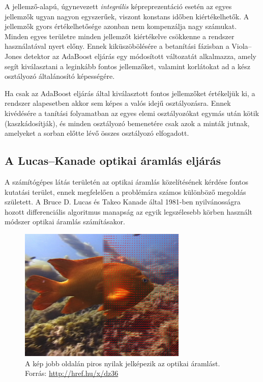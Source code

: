A jellemző-alapú, úgynevezett \emph{integrális} képreprezentáció esetén az egyes jellemzők ugyan nagyon egyszerűek, viszont konstans időben kiértékelhetők. A jellemzők gyors értékelhetősége azonban nem kompenzálja nagy számukat. Minden egyes területre minden jellemzőt kiértékelve csökkenne a rendszer használatával nyert előny. Ennek kiküszöbölésére a betanítási fázisban a Viola--Jones detektor az AdaBoost \cite{freund} eljárás egy módosított változatát alkalmazza, amely segít kiválasztani a leginkább fontos jellemzőket, valamint korlátokat ad a kész osztályozó általánosító képességére.

Ha csak az AdaBoost eljárás által kiválasztott fontos jellemzőket értékeljük ki, a rendszer alapesetben akkor sem képes a valós idejű osztályozásra. Ennek kivédésére a tanítási folyamatban az egyes elemi osztályozókat egymás után kötik (kaszkádosítják), és minden osztályozó bemenetére csak azok a minták jutnak, amelyeket a sorban előtte lévő összes osztályozó elfogadott.

\subsection{A Lucas--Kanade optikai áramlás eljárás}\label{sect:optflow}

A számítógépes látás területén az optikai áramlás közelítésének kérdése fontos kutatási terület, ennek megfelelően a problémára számos különböző megoldás született. A Bruce D. Lucas és Takeo Kanade által 1981-ben nyilvánosságra hozott \cite{lk} differenciális algoritmus manapság az egyik legszélesebb körben használt módszer optikai áramlás számításakor.

\begin{figure}[!ht]
\centering
\includegraphics[width=80mm, keepaspectratio]{figures/opticalflow.png}
\caption{A kép jobb oldalán piros nyilak jelképezik az optikai áramlást.\\Forrás: \url{http://href.hu/x/dz36}}
\label{fig:optical_flow}
\end{figure}

